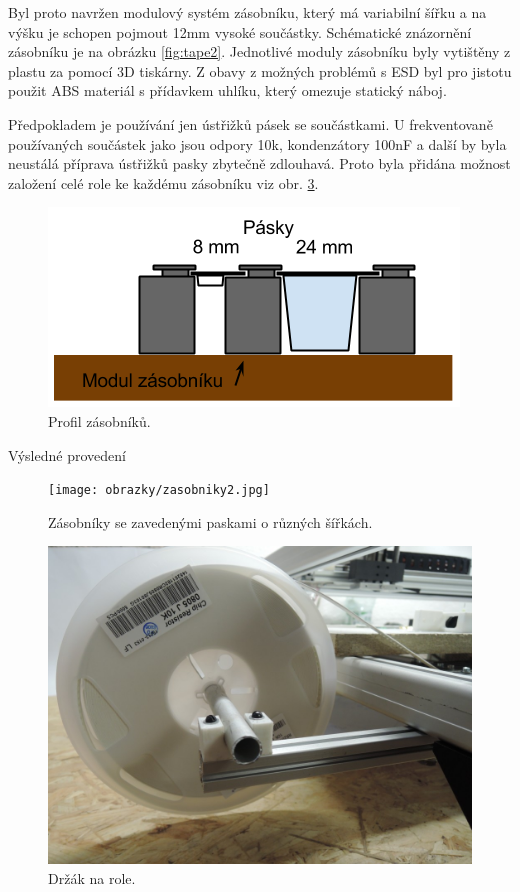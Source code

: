 Byl proto navržen modulový systém zásobníku, který má variabilní šířku a na výšku je schopen pojmout 12mm vysoké součástky. Schématické znázornění zásobníku je na obrázku \ref{fig:tape2}. Jednotlivé moduly zásobníku byly vytištěny z plastu za pomocí 3D tiskárny. Z obavy z možných problémů s ESD byl pro jistotu použit ABS materiál s přídavkem uhlíku, který omezuje statický náboj.

Předpokladem je používání jen ústřižků pásek se součástkami. U frekventovaně používaných součástek jako jsou odpory 10k, kondenzátory 100nF a další by byla neustálá příprava ústřižků pasky zbytečně zdlouhavá. Proto byla přidána možnost založení celé role ke každému zásobníku viz obr. \ref{fig:role}.  

\begin{figure}[h!]
  \centering
    \includegraphics{obrazky/zasobnik.png}%
    \caption{Profil zásobníků.}
    \label{fig:zasobnik}
\end{figure}



Výsledné provedení 
\begin{figure}[h!]
  \centering
    \texttt{[image: obrazky/zasobniky2.jpg]}%
    \caption{Zásobníky se zavedenými paskami o různých šířkách.}
    \label{fig:zasobniky}
\end{figure}

\begin{figure}[h!]
  \centering
    \includegraphics[width=0.85\linewidth]{obrazky/role.jpg}%
    \caption{Držák na role.}
    \label{fig:role}
\end{figure}

